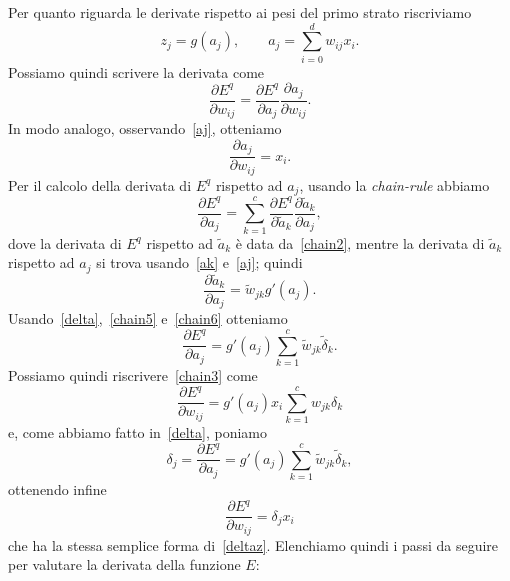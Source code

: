 \documentclass[11pt,a4paper,twoside,
openright]{book}
\begin{document}
Per quanto riguarda le derivate rispetto ai pesi del primo strato riscriviamo
\begin{equation}
z_j=g(a_j), \qquad
 a_j=\sum\limits_{i=0}^d w_{ij}x_i.
\label{aj}
\end{equation}
Possiamo quindi scrivere la derivata come
\begin{equation}
\frac{\partial E^q}{\partial w_{ij}}=\frac{\partial E^q}{\partial a_j}\frac{\partial a_j}{\partial w_{ij}}.
\label{chain3}
\end{equation}
In modo analogo, osservando~\eqref{aj}, otteniamo
\begin{equation}
\frac{\partial a_j}{\partial w_{ij}}=x_i.
\label{chain4}
\end{equation}
Per il calcolo della derivata di $E^q$ rispetto ad $a_j$, usando la \textit{chain-rule} abbiamo
\begin{equation}
\frac{\partial E^q}{\partial a_j}=\sum\limits_{k=1}^c \frac{\partial E^q}{\partial \tilde{a}_k}\frac{\partial \tilde{a}_k}{\partial a_j},
\label{chain5}
\end{equation}
dove la derivata di $E^q$ rispetto ad $\tilde{a}_k$ è data da~\eqref{chain2}, mentre la derivata di $\tilde{a}_k$ rispetto ad $a_j$ si trova usando~\eqref{ak} e~\eqref{aj}; quindi
\begin{equation}
\frac{\partial \tilde{a}_k}{\partial a_j}=\tilde{w}_{jk}g'(a_j).
\label{chain6}
\end{equation}
Usando~\eqref{delta},~\eqref{chain5} e~\eqref{chain6} otteniamo
\begin{equation}
\frac{\partial E^q}{\partial a_{j}}=g'(a_j)\sum\limits_{k=1}^c \tilde{w}_{jk}\tilde{\delta}_k.
\label{chain7}
\end{equation}
Possiamo quindi riscrivere~\eqref{chain3} come
\begin{equation}
\frac{\partial E^q}{\partial w_{ij}}=g'(a_j)x_i\sum\limits_{k=1}^c w_{jk}\delta_k
\label{chain8}
\end{equation}
e, come abbiamo fatto in~\eqref{delta}, poniamo
\begin{equation}
\delta_j = \frac{\partial E^q}{\partial a_j}=g'(a_j)\sum\limits_{k=1}^c \tilde{w}_{jk}\tilde{\delta}_k,
\label{delta2}
\end{equation}
ottenendo infine
\begin{equation}
\frac{\partial E^q}{\partial w_{ij}}=\delta_j x_i
\label{deltax}
\end{equation}
che ha la stessa semplice forma di~\eqref{deltaz}.
Elenchiamo quindi i passi da seguire per valutare la derivata della funzione $E$:
\end{document}
